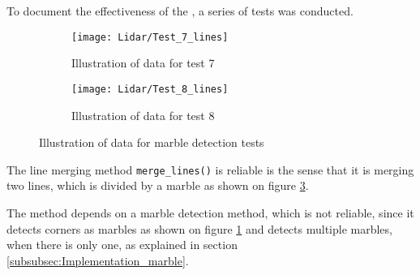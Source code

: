 \documentclass[../Head/Main.tex]{subfiles}
\begin{document}
To document the effectiveness of the , a series of tests was conducted.
\begin{figure}[H]
  \begin{subfigure}[b]{0.5\textwidth}
  	\centering
    \texttt{[image: Lidar/Test\_7\_lines]}
    \caption{Illustration of data for test 7}
    \label{fig:LineTest7}
  \end{subfigure}
  \hfill
  \begin{subfigure}[b]{0.5\textwidth}
  	\centering
    \texttt{[image: Lidar/Test\_8\_lines]}
    \caption{Illustration of data for test 8}
    \label{fig:LineTest8}
  \end{subfigure}
  \caption{Illustration of data for marble detection tests}
\end{figure}
The line merging method \texttt{merge\_lines()} is reliable is the sense that it is merging two lines, which is divided by a marble as shown on figure \ref{fig:LineTest8}. \par
The method depends on a marble detection method, which is not reliable, since it detects corners as marbles as shown on figure \ref{fig:LineTest7} and detects multiple marbles, when there is only one, as explained in section \ref{subsubsec:Implementation_marble}.
\end{document}

